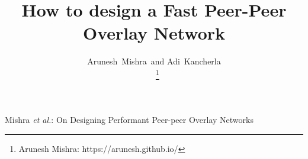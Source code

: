 \documentclass[journal]{IEEEtran}
\begin{document}
%
\title{How to design a Fast Peer-Peer Overlay Network}
%
%
%

\author{Arunesh~Mishra~and Adi~Kancherla\\~%
\thanks{Arunesh Mishra: https://arunesh.github.io/}}%

% 
%


%
{Mishra \MakeLowercase{\textit{et al.}}: On Designing Performant Peer-peer Overlay Networks}
% 
\end{document}

